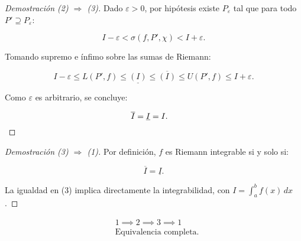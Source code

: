 \documentclass{article}
\begin{document}
	\begin{proof}[Demostración (2) \(\Rightarrow\) (3)]
		Dado \( \varepsilon > 0 \), por hipótesis existe \( P_\varepsilon \) tal que para todo \( P' \supseteq P_\varepsilon \):
		
		
		\[
		I - \varepsilon < \sigma(f, P', \chi) < I + \varepsilon.
		\]
		
		
		Tomando supremo e ínfimo sobre las sumas de Riemann:
		
		
		\[
		I - \varepsilon \leq L(P', f) \leq \underline{(I)}  \leq \overline{(I)}  \leq U(P', f) \leq I + \varepsilon.
		\]
		
		
		Como \( \varepsilon \) es arbitrario, se concluye:
		
		
		\[
		\overline{I} = \underline{I} = I. \quad \qedhere
		\]
	\end{proof}
	
	\begin{proof}[Demostración (3) \(\Rightarrow\) (1)]
		Por definición, \( f \) es Riemann integrable si y solo si:
		
		
		\[
		\overline{I} = \underline{I} .
		\]
		
		
		La igualdad en (3) implica directamente la integrabilidad, con \( I = \int_a^b f(x)\, dx \). \quad \qedhere
	\end{proof}
	
	
	
	\[
	\boxed{
		\begin{aligned}
			&1 \implies 2 \implies 3 \implies 1 \\
			&\text{Equivalencia completa.}
		\end{aligned}
	}
	\]
	
	
\end{document}
